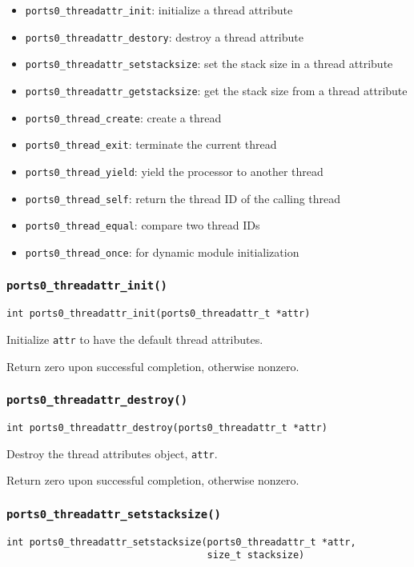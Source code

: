 \begin{itemize}
\item {\tt ports0\_threadattr\_init}: initialize a thread attribute
\item {\tt ports0\_threadattr\_destory}: destroy a thread attribute
\item {\tt ports0\_threadattr\_setstacksize}: set the stack size in a
thread attribute 
\item {\tt ports0\_threadattr\_getstacksize}: get the stack size from
a thread attribute
\item {\tt ports0\_thread\_create}: create a thread
\item {\tt ports0\_thread\_exit}: terminate the current thread 
\item {\tt ports0\_thread\_yield}: yield the processor to
another thread
\item {\tt ports0\_thread\_self}: return the thread ID of the calling
thread
\item {\tt ports0\_thread\_equal}: compare two thread IDs
\item {\tt ports0\_thread\_once}: for dynamic module initialization
\end{itemize}


\subsubsection{\tt ports0\_threadattr\_init()}
\begin{verbatim}
int ports0_threadattr_init(ports0_threadattr_t *attr)
\end{verbatim}

Initialize {\tt attr} to have the default thread attributes.

Return zero upon successful completion, otherwise nonzero.


\subsubsection{\tt ports0\_threadattr\_destroy()}
\begin{verbatim}
int ports0_threadattr_destroy(ports0_threadattr_t *attr)
\end{verbatim}

Destroy the thread attributes object, {\tt attr}.

Return zero upon successful completion, otherwise nonzero.


\subsubsection{\tt ports0\_threadattr\_setstacksize()}
\begin{verbatim}
int ports0_threadattr_setstacksize(ports0_threadattr_t *attr,
                                   size_t stacksize)
\end{verbatim}

